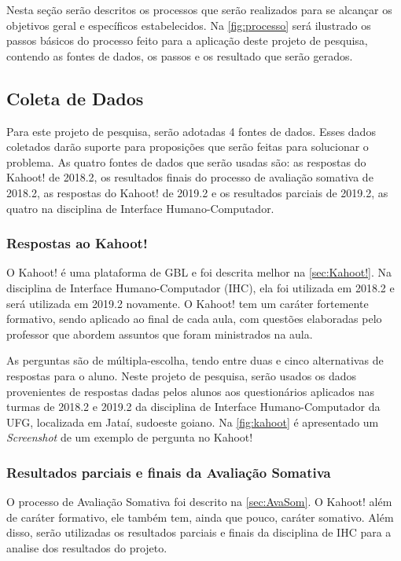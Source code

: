 \documentclass[
	12pt,				%
	openright,			%
	oneside,
	a4paper,			%
	english,			%
	french,				%
	spanish,			%
	brazil,				%
	]{abntex2}
\begin{document}
Nesta seção serão descritos os processos que serão realizados para se alcançar os objetivos geral e específicos estabelecidos. Na \autoref{fig:processo} será ilustrado os passos básicos do processo feito para a aplicação deste projeto de pesquisa, contendo as fontes de dados, os passos e os resultado que serão gerados.

\subsection{Coleta de Dados}
Para este projeto de pesquisa, serão adotadas 4 fontes de dados. Esses dados coletados darão suporte para proposições que serão feitas para solucionar o problema. As quatro fontes de dados que serão usadas são: as respostas do Kahoot! de 2018.2, os resultados finais do processo de avaliação somativa de 2018.2, as respostas do Kahoot! de 2019.2 e os resultados parciais de 2019.2, as quatro na disciplina de Interface Humano-Computador.

\subsubsection{Respostas ao Kahoot!}
O Kahoot! é uma plataforma de GBL e foi descrita melhor na \autoref{sec:Kahoot!}. Na disciplina de Interface Humano-Computador (IHC), ela foi utilizada em 2018.2 e será utilizada em 2019.2 novamente. O Kahoot! tem um caráter fortemente formativo, sendo aplicado ao final de cada aula, com questões elaboradas pelo professor que abordem assuntos que foram ministrados na aula. 

As perguntas são de múltipla-escolha, tendo entre duas e cinco alternativas de respostas para o aluno. Neste projeto de pesquisa, serão usados os dados provenientes de respostas dadas pelos alunos aos questionários aplicados nas turmas de 2018.2 e 2019.2 da disciplina de Interface Humano-Computador da UFG, localizada em Jataí, sudoeste goiano. Na \autoref{fig:kahoot} é apresentado um \textit{Screenshot} de um exemplo de pergunta no Kahoot!

\subsubsection{Resultados parciais e finais da Avaliação Somativa}

O processo de Avaliação Somativa foi descrito na \autoref{sec:AvaSom}. O Kahoot! além de caráter formativo, ele também tem, ainda que pouco, caráter somativo. Além disso, serão utilizadas os resultados parciais e finais da disciplina de IHC para a analise dos resultados do projeto.
\end{document}
